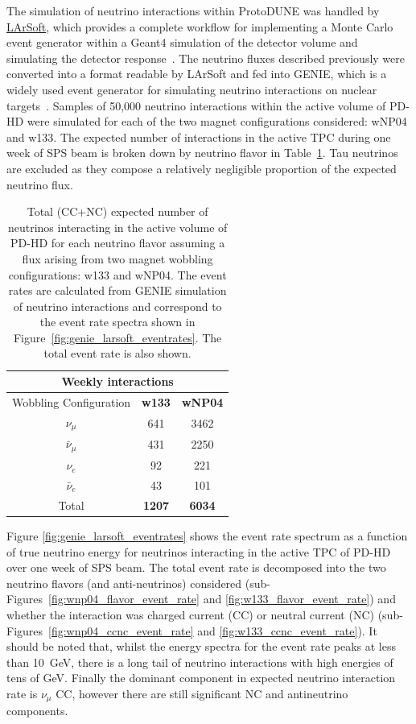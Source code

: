 The simulation of neutrino interactions within ProtoDUNE was handled by \href{https://larsoft.org/}{LArSoft}, which provides a complete workflow for implementing a Monte Carlo event generator within a Geant4 simulation of the detector volume and simulating the detector response~\cite{LArSoft, Church:2013hea}. The neutrino fluxes described previously were converted into a format readable by LArSoft and fed into GENIE, which is a widely used event generator for simulating neutrino interactions on nuclear targets~\cite{GENIE}. Samples of 50,000 neutrino interactions within the active volume of PD-HD were simulated for each of the two magnet configurations considered: wNP04 and w133. The expected number of interactions in the active TPC during one week of SPS beam is broken down by neutrino flavor in Table~\ref{tab:number_events}. Tau neutrinos are excluded as they compose a relatively negligible proportion of the expected neutrino flux.

\begin{table}[]
    \centering
    \begin{tabular}{|c|c|c|}
        \hline
        \multicolumn{3}{|c|}{\textbf{Weekly interactions}} \\
        \hline
        Wobbling Configuration & \textbf{w133} & \textbf{wNP04} \\
        \hline
        $\nu_\mu$ & 641 & 3462 \\
        $\bar{\nu}_\mu$ & 431 & 2250 \\
        $\nu_e$ & 92 & 221 \\
        $\bar{\nu}_e$  & 43 & 101 \\
        \hline
        Total & \textbf{1207} & \textbf{6034} \\
        \hline
    \end{tabular}
    \caption{Total (CC+NC) expected number of neutrinos interacting in the active volume of PD-HD for each neutrino flavor assuming a flux arising from two magnet wobbling configurations: w133 and wNP04. The event rates are calculated from GENIE simulation of neutrino interactions and correspond to the event rate spectra shown in Figure~\ref{fig:genie_larsoft_eventrates}. The total event rate is also shown.}
    \label{tab:number_events}
\end{table}

Figure \ref{fig:genie_larsoft_eventrates} shows the event rate spectrum as a function of true neutrino energy for neutrinos interacting in the active TPC of PD-HD over one week of SPS beam. The total event rate is decomposed into the two neutrino flavors (and anti-neutrinos) considered (sub-Figures~\ref{fig:wnp04_flavor_event_rate} and \ref{fig:w133_flavor_event_rate}) and whether the interaction was charged current  (CC) or neutral current (NC) (sub-Figures~\ref{fig:wnp04_ccnc_event_rate} and \ref{fig:w133_ccnc_event_rate}). It should be noted that, whilst the energy spectra for the event rate peaks at less than 10~GeV, there is a long tail of neutrino interactions with high energies of tens of GeV. Finally the dominant component in expected neutrino interaction rate is $\nu_{\mu}$ CC, however there are still significant NC and antineutrino components.

